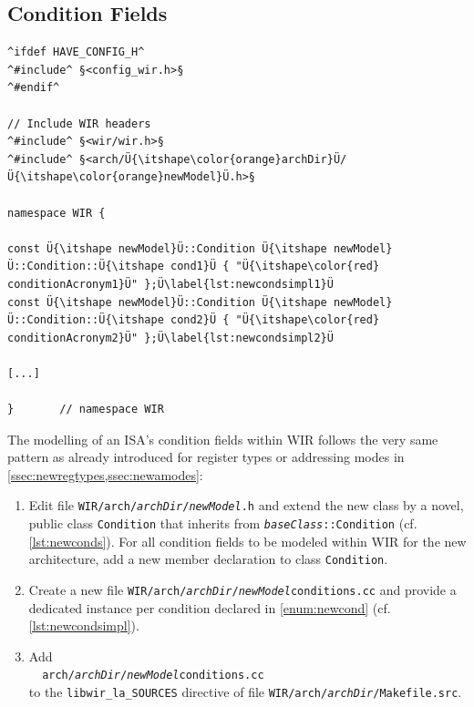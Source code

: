 \subsection{Condition Fields}
\label{ssec:newcond}

\begin{lstlisting}[style=code,float=!t,caption={Implementation of a New Processor Model's Condition Fields},label=lst:newcondsimpl]
^ifdef HAVE_CONFIG_H^
^#include^ §<config_wir.h>§
^#endif^

// Include WIR headers
^#include^ §<wir/wir.h>§
^#include^ §<arch/Ü{\itshape\color{orange}archDir}Ü/Ü{\itshape\color{orange}newModel}Ü.h>§

namespace WIR {

const Ü{\itshape newModel}Ü::Condition Ü{\itshape newModel}Ü::Condition::Ü{\itshape cond1}Ü { "Ü{\itshape\color{red} conditionAcronym1}Ü" };Ü\label{lst:newcondsimpl1}Ü
const Ü{\itshape newModel}Ü::Condition Ü{\itshape newModel}Ü::Condition::Ü{\itshape cond2}Ü { "Ü{\itshape\color{red} conditionAcronym2}Ü" };Ü\label{lst:newcondsimpl2}Ü

[...]

}       // namespace WIR
\end{lstlisting}

The modelling of an \gls{ISA}'s condition fields within \gls{WIR} follows the very same pattern as already introduced for register types or addressing modes in \cref{ssec:newregtypes,ssec:newamodes}:
\begin{enumerate}[resume]
  \item Edit file \texttt{WIR/arch/{\itshape archDir}/{\itshape newModel}.h} and extend the new class by a novel, public class \texttt{Condition} that inherits from \texttt{{\itshape baseClass}::Condition} (cf. \cref{lst:newconds}).
  For all condition fields to be modeled within \gls{WIR} for the new architecture, add a new member declaration to class \texttt{Condition}.\label{enum:newcond}

  \item Create a new file \texttt{WIR/arch/{\itshape archDir}/{\itshape newModel}conditions.cc} and provide a dedicated instance per condition declared in \cref{enum:newcond} (cf. \cref{lst:newcondsimpl}).

  \item Add \\
  \verb|  arch/|\texttt{\itshape archDir}\verb|/|\texttt{\itshape newModel}\verb|conditions.cc| \\
  to the \texttt{libwir\_la\_SOURCES} directive of file \texttt{WIR/arch/{\itshape archDir}/Makefile.src}.
\end{enumerate}



